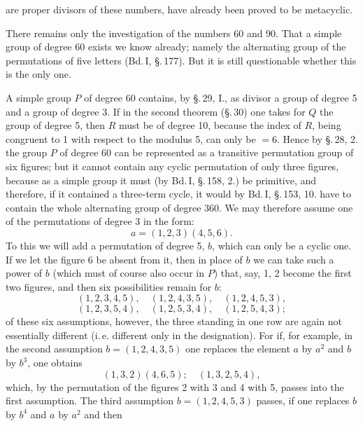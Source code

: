 are proper divisors of these numbers, have already been proved to be metacyclic.

There remains only the investigation of the numbers 60 and 90. That a simple group of degree 60 exists we know already; namely the alternating group of the permutations of five letters (Bd.\,I, \S.\,177). But it is still questionable whether this is the only one.

A simple group $P$ of degree 60 contains, by \S.\,29, I., as divisor a group of degree 5 and a group of degree 3. If in the second  theorem (\S.\,30) one takes for $Q$ the group of degree 5, then $R$ must be of degree 10, because the index of $R$, being congruent to 1 with respect to the modulus 5, can only be $= 6$. Hence by \S.\,28, 2. the group $P$ of degree 60 can be represented as a transitive permutation group of six figures; but it cannot contain any cyclic permutation of only three figures, because as a simple group it must (by Bd.\,I, \S.\,158, 2.) be primitive, and therefore, if it contained a three-term cycle, it would by Bd.\,I, \S.\,153, 10. have to contain the whole alternating group of degree 360. We may therefore assume one of the permutations of degree 3 in the form:
\[
a = (1, 2, 3) (4, 5, 6).
\]
To this we will add a permutation of degree 5, $b$, which can only be a cyclic one. If we let the figure 6 be absent from it, then in place of $b$ we can take such a power of $b$ (which must of course also occur in $P$) that, say, 1, 2 become the first two figures, and then six possibilities remain for $b$:
\[
(1, 2, 3, 4, 5), \quad (1, 2, 4, 3, 5), \quad (1, 2, 4, 5, 3),
\]
\[
(1, 2, 3, 5, 4), \quad (1, 2, 5, 3, 4), \quad (1, 2, 5, 4, 3);
\]
of these six assumptions, however, the three standing in one row are again not essentially different (i.\,e. different only in the designation). For if, for example, in the second assumption $b = (1, 2, 4, 3, 5)$ one replaces the element $a$ by $a^2$ and $b$ by $b^3$, one obtains
\[
(1, 3, 2) (4, 6, 5); \quad (1, 3, 2, 5, 4),
\]
which, by the permutation of the figures 2 with 3 and 4 with 5, passes into the first assumption. The third assumption $b = (1, 2, 4, 5, 3)$ passes, if one replaces $b$ by $b^4$ and $a$ by $a^2$ and then
